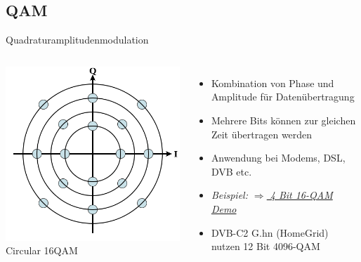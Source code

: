 \subsection{QAM}
\begin{frame}{Quadraturamplitudenmodulation}
  \begin{columns}
    \includegraphics[width=\textwidth,height=.8\textheight,keepaspectratio]{a15/Circular_16QAM.png}\\
    {\tiny Circular 16QAM}
    \begin{itemize}
      \item Kombination von Phase und Amplitude für Datenübertragung
      \item Mehrere Bits können zur gleichen Zeit übertragen werden
      \item Anwendung bei Modems, DSL, DVB etc.
      \item \emph{Beispiel: \href{https://upload.wikimedia.org/wikipedia/commons/9/90/QAM16_Demonstration.gif}{$\Rightarrow$ 4 Bit 16-QAM Demo}}
      \item DVB-C2 G.hn (HomeGrid) nutzen 12 Bit 4096-QAM
    \end{itemize}
  \end{columns}
\end{frame}



